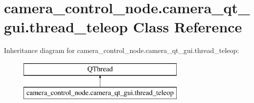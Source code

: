\hypertarget{classcamera__control__node_1_1camera__qt__gui_1_1thread__teleop}{\section{camera\-\_\-control\-\_\-node.\-camera\-\_\-qt\-\_\-gui.\-thread\-\_\-teleop Class Reference}
\label{classcamera__control__node_1_1camera__qt__gui_1_1thread__teleop}
}
Inheritance diagram for camera\-\_\-control\-\_\-node.\-camera\-\_\-qt\-\_\-gui.\-thread\-\_\-teleop\-:\begin{figure}[H]
\begin{center}
\leavevmode
\includegraphics[height=2.000000cm]{classcamera__control__node_1_1camera__qt__gui_1_1thread__teleop}
\end{center}
\end{figure}
